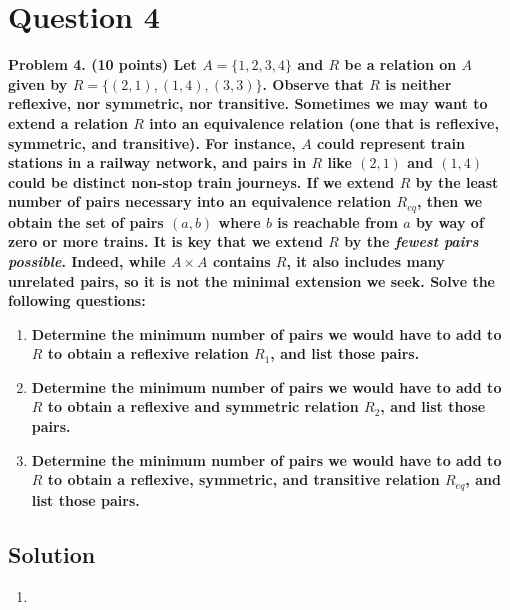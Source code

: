 \documentclass[11pt]{article}
\begin{document}
\clearpage
\section*{Question 4}

    \textbf{Problem 4. (10 points) Let $A = \{1, 2, 3, 4\}$ and $R$ be a relation on $A$ given by $R = \{(2, 1), (1, 4), (3, 3)\}$. Observe that $R$ is neither reflexive, nor symmetric, nor transitive. Sometimes we may want to extend a relation $R$ into an equivalence relation (one that is reflexive, symmetric, and transitive). For instance, $A$ could represent train stations in a railway network, and pairs in $R$ like $(2, 1)$ and $(1, 4)$ could be distinct non-stop train journeys. If we extend $R$ by the least number of pairs necessary into an equivalence relation $R_{eq}$, then we obtain the set of pairs $(a, b)$ where $b$ is reachable from $a$ by way of zero or more trains. It is key that we extend $R$ by the \textit{fewest pairs possible}. Indeed, while $A \times A$ contains $R$, it also includes many unrelated pairs, so it is not the minimal extension we seek. Solve the following questions:}
    \begin{enumerate}[label=(\alph*)]
        \item \textbf{Determine the minimum number of pairs we would have to add to $R$ to obtain a reflexive relation $R_1$, and list those pairs.}
        \item \textbf{Determine the minimum number of pairs we would have to add to $R$ to obtain a reflexive and symmetric relation $R_2$, and list those pairs.}
        \item \textbf{Determine the minimum number of pairs we would have to add to $R$ to obtain a reflexive, symmetric, and transitive relation $R_{eq}$, and list those pairs.}
    \end{enumerate}


    \subsection*{Solution}
    \begin{enumerate}[label=(\alph*)]
        \item 
    \end{enumerate}
\end{document}
